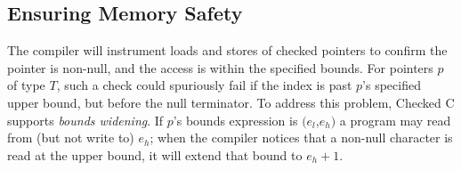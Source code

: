 \iffalse

\subsection{Ensuring Memory Safety}


%
%
%
%
%
%

The \checkedc compiler will instrument loads and stores of checked
pointers to confirm the pointer is non-null, and the access is within
the specified bounds. For pointers $p$ of type
$T$\code{>}, such a check could spuriously fail if
the index is past $p$'s specified upper bound, but before the null
terminator. To address this problem, Checked C supports \emph{bounds
  widening}.
If $p$'s bounds expression is $(e_l$,$e_h)$ a program may read from (but not
write to) $e_h$; when the compiler notices that a non-null character
is read at the upper bound, it will extend that bound to $e_h+1$.

